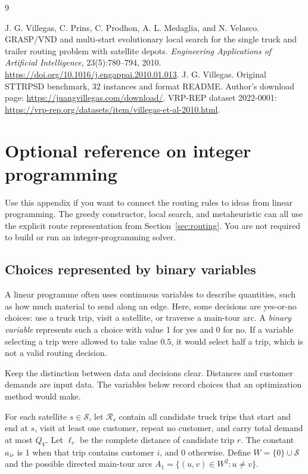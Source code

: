 \documentclass[11pt,a4paper]{article}
\newcommand{\R}{\mathcal R}\newcommand{\C}{\mathcal C}\newcommand{\Sats}{\mathcal S}
\begin{document}
\enlargethispage{12pt}
\begin{thebibliography}{9}
\footnotesize\raggedright
{} J. G. Villegas, C. Prins, C. Prodhon, A. L. Medaglia, and N. Velasco. GRASP/VND and multi-start evolutionary local search for the single truck and trailer routing problem with satellite depots. \emph{Engineering Applications of Artificial Intelligence}, 23(5):780--794, 2010. \url{https://doi.org/10.1016/j.engappai.2010.01.013}.
 J. G. Villegas. Original STTRPSD benchmark, 32 instances and format README. Author's download page: \url{https://juangvillegas.com/download/}. VRP-REP dataset 2022-0001: \url{https://vrp-rep.org/datasets/item/villegas-et-al-2010.html}.
\end{thebibliography}


\clearpage
\appendix
{}\fontsize{10.8}{12.7}\selectfont\setlength\parskip{4pt}
\section{Optional reference on integer programming}\label{app:integer}
Use this appendix if you want to connect the routing rules to ideas from linear programming. The greedy constructor, local search, and metaheuristic can all use the explicit route representation from Section~\ref{sec:routing}. You are not required to build or run an integer-programming solver.

\subsection{Choices represented by binary variables}
A linear programme often uses continuous variables to describe quantities, such as how much material to send along an edge. Here, some decisions are yes-or-no choices: use a truck trip, visit a satellite, or traverse a main-tour arc. A \emph{binary variable} represents such a choice with value 1 for yes and 0 for no. If a variable selecting a trip were allowed to take value $0.5$, it would select half a trip, which is not a valid routing decision.

Keep the distinction between data and decisions clear. Distances and customer demands are input data. The variables below record choices that an optimization method would make.

For each satellite $s\in\Sats$, let $\R_s$ contain all candidate truck trips that start and end at $s$, visit at least one customer, repeat no customer, and carry total demand at most $Q_V$. Let $\ell_r$ be the complete distance of candidate trip $r$. The constant $a_{ir}$ is 1 when that trip contains customer $i$, and 0 otherwise. Define $W=\{0\}\cup\Sats$ and the possible directed main-tour arcs $A_1=\{(u,v)\in W^2:u\ne v\}$.
\end{document}
